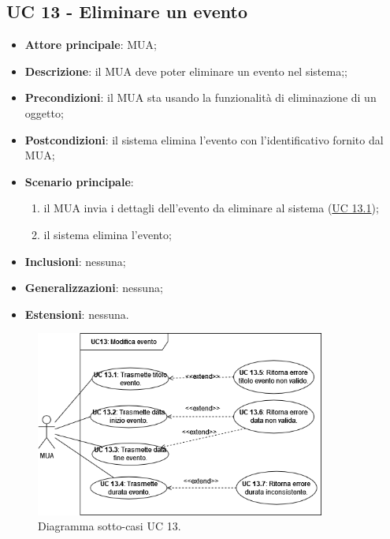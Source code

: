 \subsection{UC 13 - Eliminare un evento} \label{sec:UC13}
    \begin{itemize}
        \item \textbf{Attore principale}: MUA;
        \item \textbf{Descrizione}: il MUA deve poter eliminare un evento nel sistema;;
        \item \textbf{Precondizioni}: il MUA sta usando la funzionalità di eliminazione di un oggetto;
        \item \textbf{Postcondizioni}: il sistema elimina l'evento con l'identificativo fornito dal MUA;
        \item \textbf{Scenario principale}:
            \begin{enumerate}
                \item il MUA invia i dettagli dell'evento da eliminare al sistema (\hyperref[sec:UC13.1]{UC 13.1});
                \item il sistema elimina l'evento;
            \end{enumerate}
        \item \textbf{Inclusioni}: nessuna;
        \item \textbf{Generalizzazioni}: nessuna;
        \item \textbf{Estensioni}: nessuna.
    \end{itemize}

\begin{figure}[h]
    \includegraphics[width=0.85\textwidth]{sections/uc_imgs/UC13.png}
    \centering
    \caption{Diagramma sotto-casi UC 13.}
\end{figure}

